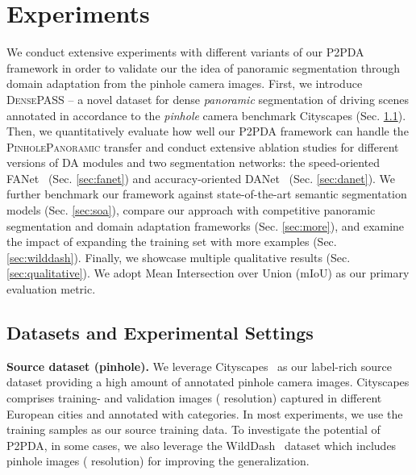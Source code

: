 \documentclass[journal]{IEEEtran}
\begin{document}
\section{Experiments}
We conduct extensive experiments with different variants of our P2PDA framework in order to validate our the  idea  of  panoramic  segmentation through domain adaptation from the pinhole camera images.
First, we introduce \textsc{DensePASS} -- a novel  dataset for dense \emph{panoramic} segmentation of driving scenes annotated in accordance to the \emph{pinhole} camera  benchmark Cityscapes (Sec. \ref{sec:dataset}). 
Then, we  quantitatively evaluate how well our P2PDA framework can handle the \textsc{PinholePanoramic} transfer and conduct extensive ablation studies for different versions of DA modules and two  segmentation networks: the speed-oriented FANet~\cite{fanet} (Sec. \ref{sec:fanet}) and accuracy-oriented  DANet~\cite{danet} (Sec. \ref{sec:danet}).
We further benchmark our framework against  state-of-the-art semantic segmentation models (Sec. \ref{sec:soa}), compare our approach with competitive panoramic segmentation and domain adaptation frameworks (Sec. \ref{sec:more}), and examine the impact of expanding the training set  with more examples (Sec. \ref{sec:wilddash}).
Finally, we showcase multiple qualitative results (Sec. \ref{sec:qualitative}).
We adopt Mean Intersection over Union (mIoU) as our primary evaluation metric.

\subsection{Datasets and Experimental Settings}
\label{sec:dataset}

\textbf{Source dataset (pinhole).} 
We leverage  Cityscapes~\cite{cityscapes} as our label-rich source dataset providing a high amount of annotated pinhole camera images.
Cityscapes comprises  training- and  validation images ( resolution) captured in  different European cities and annotated with  categories. 
In most experiments, we use the  training samples as our source training data.
To investigate the potential of P2PDA, in some cases, we also leverage the WildDash~\cite{wilddash} dataset which includes  pinhole images ( resolution) for improving the generalization.   
\end{document}
